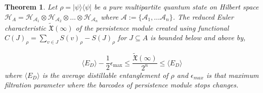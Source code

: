 \documentclass{article}
\newtheorem{theorem}{Theorem}
\newcommand{\ketbra}[2]{| #1\rangle\! \langle #2|}
\begin{document}
\begin{theorem}
Let $\rho = \ketbra{\psi}{\psi}$ be a pure multipartite quantum state on Hilbert space $\mathcal{H}_A = \mathcal{H}_{\mathcal{A}_1} \otimes \mathcal{H}_{\mathcal{A}_2} \otimes \dots \otimes \mathcal{H}_{\mathcal{A}_n}$  where $\mathcal{A} := \{\mathcal{A}_1, \dots \mathcal{A}_n\}$. The reduced Euler characteristic $\tilde{\mathfrak{X}}(\infty)$ of the persistence module created using functional $C(J)_\rho = \sum_{v \in J} S(v)_\rho - S(J)_\rho$ for $J \subseteq A$ is bounded below and above by,

$$ \langle E_D \rangle - \frac{1}{2} \epsilon_{\text{max}}  \leq \frac{\tilde{\mathfrak{X}}(\infty)}{2^n} \leq \langle E_D \rangle$$
where $\langle E_D \rangle$ is the average distillable entanglement of $\rho$ and $\epsilon_{max}$ is that maximum filtration parameter where the barcodes of persistence module stops changes.
\end{theorem}
\end{document}
